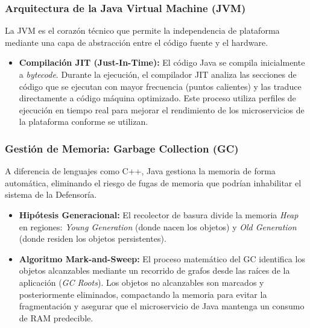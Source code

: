 \subsubsection{Arquitectura de la Java Virtual Machine (JVM)}
La JVM es el corazón técnico que permite la independencia de plataforma mediante una capa de abstracción entre el código fuente y el hardware.
\begin{itemize}
\item \textbf{Compilación JIT (Just-In-Time):} El código Java se compila inicialmente a \textit{bytecode}. Durante la ejecución, el compilador JIT analiza las secciones de código que se ejecutan con mayor frecuencia (puntos calientes) y las traduce directamente a código máquina optimizado. Este proceso utiliza perfiles de ejecución en tiempo real para mejorar el rendimiento de los microservicios de la plataforma conforme se utilizan.
\end{itemize}

\subsubsection{Gestión de Memoria: Garbage Collection (GC)}
A diferencia de lenguajes como C++, Java gestiona la memoria de forma automática, eliminando el riesgo de fugas de memoria que podrían inhabilitar el sistema de la Defensoría.
\begin{itemize}
\item \textbf{Hipótesis Generacional:} El recolector de basura divide la memoria \textit{Heap} en regiones: \textit{Young Generation} (donde nacen los objetos) y \textit{Old Generation} (donde residen los objetos persistentes).
\item \textbf{Algoritmo Mark-and-Sweep:} El proceso matemático del GC identifica los objetos alcanzables mediante un recorrido de grafos desde las raíces de la aplicación (\textit{GC Roots}). Los objetos no alcanzables son marcados y posteriormente eliminados, compactando la memoria para evitar la fragmentación y asegurar que el microservicio de Java mantenga un consumo de RAM predecible.
\end{itemize}

